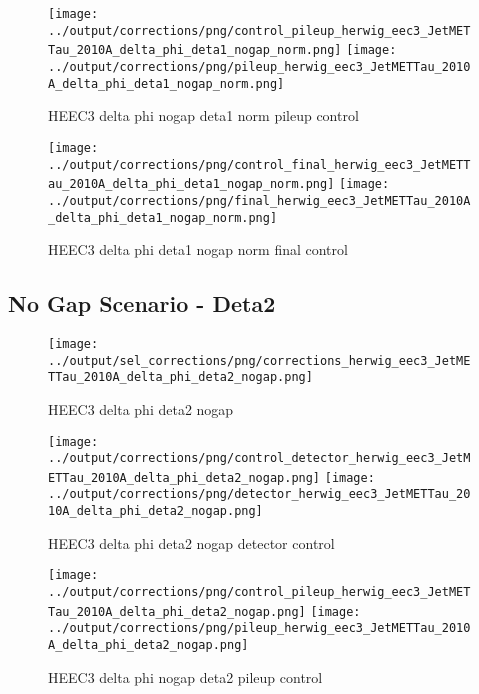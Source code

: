 \documentclass[11pt]{book}
\begin{document}
\begin{figure}[ht]
\centering
\texttt{[image: ../output/corrections/png/control\_pileup\_herwig\_eec3\_JetMETTau\_2010A\_delta\_phi\_deta1\_nogap\_norm.png]}
\texttt{[image: ../output/corrections/png/pileup\_herwig\_eec3\_JetMETTau\_2010A\_delta\_phi\_deta1\_nogap\_norm.png]}
\caption{HEEC3 delta phi nogap deta1 norm pileup control}
\label{fig:HEEC3_JetMETTau_2010A_delta_phi_deta1_nogap_norm_pileup_control}
\end{figure}


\begin{figure}[ht]
\centering
\texttt{[image: ../output/corrections/png/control\_final\_herwig\_eec3\_JetMETTau\_2010A\_delta\_phi\_deta1\_nogap\_norm.png]}
\texttt{[image: ../output/corrections/png/final\_herwig\_eec3\_JetMETTau\_2010A\_delta\_phi\_deta1\_nogap\_norm.png]}
\caption{HEEC3 delta phi deta1 nogap norm final control}
\label{fig:HEEC3_JetMETTau_2010A_delta_phi_deta1_nogap_norm_final_control}
\end{figure}


\clearpage
\subsection{No Gap Scenario - Deta2}
\begin{figure}[ht]
\centering
\texttt{[image: ../output/sel\_corrections/png/corrections\_herwig\_eec3\_JetMETTau\_2010A\_delta\_phi\_deta2\_nogap.png]}
\caption{HEEC3 delta phi deta2 nogap}
\label{fig:HEEC3_JetMETTau_2010A_delta_phi_deta2_nogap}
\end{figure}

\begin{figure}[ht]
\centering
\texttt{[image: ../output/corrections/png/control\_detector\_herwig\_eec3\_JetMETTau\_2010A\_delta\_phi\_deta2\_nogap.png]}
\texttt{[image: ../output/corrections/png/detector\_herwig\_eec3\_JetMETTau\_2010A\_delta\_phi\_deta2\_nogap.png]}
\caption{HEEC3 delta phi deta2 nogap detector control}
\label{fig:HEEC3_JetMETTau_2010A_delta_phi_deta2_nogap_detector_control}
\end{figure}

\begin{figure}[ht]
\centering
\texttt{[image: ../output/corrections/png/control\_pileup\_herwig\_eec3\_JetMETTau\_2010A\_delta\_phi\_deta2\_nogap.png]}
\texttt{[image: ../output/corrections/png/pileup\_herwig\_eec3\_JetMETTau\_2010A\_delta\_phi\_deta2\_nogap.png]}
\caption{HEEC3 delta phi nogap deta2 pileup control}
\label{fig:HEEC3_JetMETTau_2010A_delta_phi_deta2_nogap_pileup_control}
\end{figure}
\end{document}
